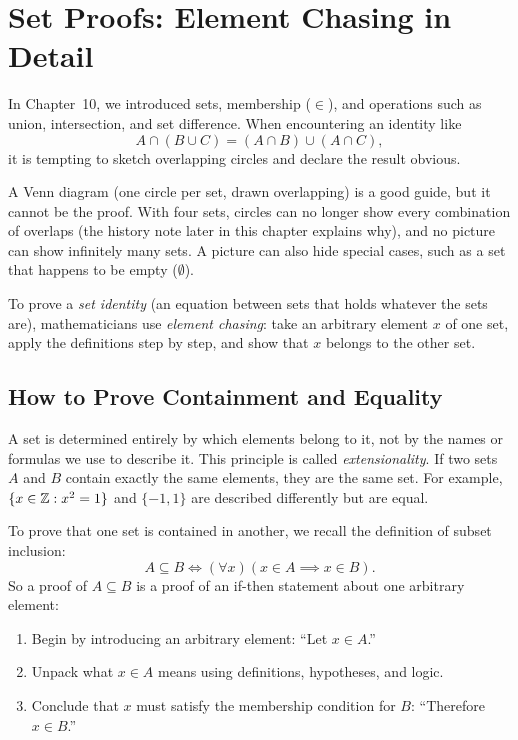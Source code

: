 \section{Set Proofs: Element Chasing in Detail}
\chapterline

In Chapter~10, we introduced sets, membership ($\in$), and operations such as union, intersection, and set difference. When encountering an identity like
\[
A \cap (B \cup C) = (A \cap B) \cup (A \cap C),
\]
it is tempting to sketch overlapping circles and declare the result obvious.

A Venn diagram (one circle per set, drawn overlapping) is a good guide, but it cannot be the proof. With four sets, circles can no longer show every combination of overlaps (the history note later in this chapter explains why), and no picture can show infinitely many sets. A picture can also hide special cases, such as a set that happens to be empty ($\emptyset$).

To prove a \emph{set identity} (an equation between sets that holds whatever the sets are), mathematicians use \emph{element chasing}: take an arbitrary element $x$ of one set, apply the definitions step by step, and show that $x$ belongs to the other set.

\subsection{How to Prove Containment and Equality}

A set is determined entirely by which elements belong to it, not by the names or formulas we use to describe it. This principle is called \emph{extensionality}. If two sets $A$ and $B$ contain exactly the same elements, they are the same set. For example, $\{x \in \mathbb{Z} : x^2 = 1\}$ and $\{-1, 1\}$ are described differently but are equal.

To prove that one set is contained in another, we recall the definition of subset inclusion:
\[
A \subseteq B \iff (\forall x)(x \in A \implies x \in B).
\]
So a proof of $A \subseteq B$ is a proof of an if-then statement about one arbitrary element:
\begin{enumerate}[label=\arabic*.]
\item Begin by introducing an arbitrary element: ``Let $x \in A$.''
\item Unpack what $x \in A$ means using definitions, hypotheses, and logic.
\item Conclude that $x$ must satisfy the membership condition for $B$: ``Therefore $x \in B$.''
\end{enumerate}

